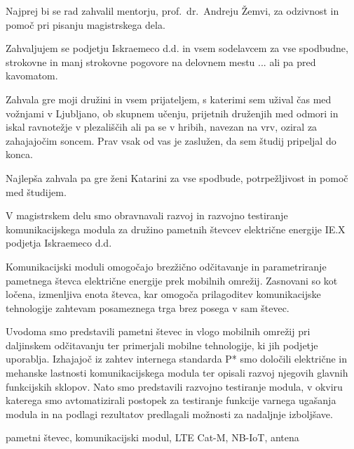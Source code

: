 \documentclass[a4paper,twoside,openright,12pt,slovene]{book}
\date{Ljubljana, \the\year}
\begin{document}
\frontmatter


\maketitle

\zahvala
Najprej bi se rad zahvalil mentorju, prof.~dr.~Andreju Žemvi, za odzivnost in pomoč pri pisanju magistrskega dela.

Zahvaljujem se podjetju Iskraemeco d.d. in vsem sodelavcem za vse spodbudne, strokovne in manj strokovne pogovore na delovnem mestu ... ali pa pred kavomatom.

Zahvala gre moji družini in vsem prijateljem, s katerimi sem užival čas med vožnjami v Ljubljano, ob skupnem učenju, prijetnih druženjih med odmori in iskal ravnotežje v plezališčih ali pa se v hribih, navezan na vrv, oziral za zahajajočim soncem. Prav vsak od vas je zaslužen, da sem študij pripeljal do konca.

Najlepša zahvala pa gre ženi Katarini za vse spodbude, potrpežljivost in pomoč med študijem.

\povzetek
V magistrskem delu smo obravnavali razvoj in razvojno testiranje komunikacijskega modula za družino pametnih števcev električne energije IE.X podjetja Iskraemeco d.d. 
\par Komunikacijski moduli omogočajo brezžično odčitavanje in parametriranje pametnega števca električne energije prek mobilnih omrežij. Zasnovani so kot ločena, izmenljiva enota števca, kar omogoča prilagoditev komunikacijske tehnologije zahtevam posameznega trga brez posega v sam števec.
\par Uvodoma smo predstavili pametni števec in vlogo mobilnih omrežij pri daljinskem odčitavanju ter primerjali mobilne tehnologije, ki jih podjetje uporablja. Izhajajoč iz zahtev internega standarda P* smo določili električne in mehanske lastnosti komunikacijskega modula ter opisali razvoj njegovih glavnih funkcijskih sklopov. Nato smo predstavili razvojno testiranje modula, v okviru katerega smo avtomatizirali postopek za testiranje funkcije varnega ugašanja modula in na podlagi rezultatov predlagali možnosti za nadaljnje izboljšave.

\kljucnebesede
pametni števec, komunikacijski modul, LTE Cat-M, NB-IoT, antena
\end{document}
